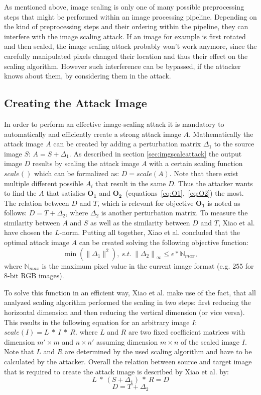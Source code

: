 \documentclass[sigconf]{acmart}
\begin{document}
As mentioned above, image scaling is only one of many possible preprocessing steps that might be performed within an image processing pipeline.
Depending on the kind of preprocessing steps and their ordering within the pipeline, they can interfere with the image scaling attack.
If an image for example is first rotated and then scaled, the image scaling attack probably won't work anymore, since the carefully manipulated pixels changed their location and thus their effect on the scaling algorithm.
However such interference can be bypassed, if the attacker knows about them, by considering them in the attack.

\subsection{Creating the Attack Image}
In order to perform an effective image-scaling attack it is mandatory to automatically and efficiently create a strong attack image $A$.
Mathematically the attack image $A$ can be created by adding a perturbation matrix ${\Delta}_1$ to the source image $S$: $A = S + {\Delta}_1$.
As described in section \ref{sec:imgscaleattack} the output image $D$ results by scaling the attack image $A$ with a certain scaling function $scale()$ which can be formalized as: $D = scale(A)$.
Note that there exist multiple different possible $A_i$ that result in the same $D$.
Thus the attacker wants to find the $A$ that satisfies $\boldsymbol{O_1}$ and $\boldsymbol{O_2}$~(equations~\ref{eq:O1},~\ref{eq:O2}) the most.
The relation between $D$ and $T$, which is relevant for objective $\boldsymbol{O_1}$ is noted as follows: $D = T + {\Delta}_2$, where ${\Delta}_2$ is another perturbation matrix.
To measure the similarity between $A$ and $S$ as well as the similarity between $D$ and $T$, Xiao et al. have chosen the $L$-norm.
Putting all together, Xiao et al.\cite{camouflage} concluded that the optimal attack image $A$ can be created solving the following objective function: 
$$\min(\lVert{\Delta}_1\rVert ^2) {,~s.t.~} {\lVert{\Delta}_2\rVert}_\infty \leq \epsilon * {\mathbb{N}}_{max},$$
where ${\mathbb{N}}_{max}$ is the maximum pixel value in the current image format (e.g. 255 for 8-bit RGB images).

To solve this function in an efficient way, Xiao et al. make use of the fact, that all analyzed scaling algorithm performed the scaling in two steps: first reducing the horizontal dimension and then reducing the vertical dimension (or vice versa).
This results in the following equation for an arbitrary image $I$: $scale(I) = L~*~I~*~R$. where $L$ and $R$ are two fixed coefficient matrices with dimension $m' \times m$ and $n \times n'$ assuming dimension $m \times n$ of the scaled image $I$.
Note that $L$ and $R$ are determined by the used scaling algorithm and have to be calculated by the attacker.
Overall the relation between source and target image that is required to create the attack image is described by Xiao et al. by:
$$L~*~(S + {\Delta}_1)~*~R = D $$
$$ D = T +  {\Delta}_2$$
\end{document}
